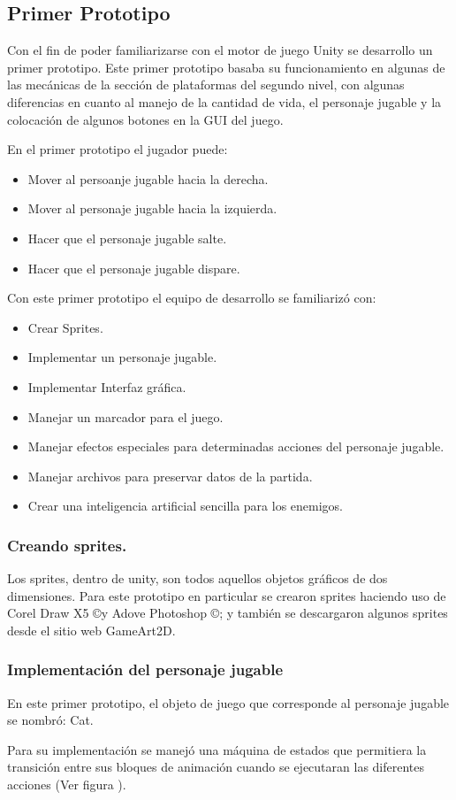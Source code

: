 \subsection{Primer Prototipo}
Con el fin de poder familiarizarse con el motor de juego Unity
se desarrollo un primer prototipo. Este primer prototipo basaba su funcionamiento 
en algunas de las mecánicas de la sección de plataformas del segundo nivel, con 
algunas diferencias en cuanto al manejo de la cantidad de vida, el personaje 
jugable y la colocación de algunos botones en la GUI del juego.
\\
\par
En el primer prototipo el jugador puede:
\begin{itemize}
	\item Mover al persoanje jugable hacia la derecha.
	\item Mover al personaje jugable hacia la izquierda.
	\item Hacer que el personaje jugable salte.
	\item Hacer que el personaje jugable dispare.
\end{itemize}

Con este primer prototipo el equipo de desarrollo se familiarizó con:
\begin{itemize}
	\item Crear Sprites.
	\item Implementar un personaje jugable.
	\item Implementar Interfaz gráfica.
	\item Manejar un marcador para el juego.
	\item Manejar efectos especiales para determinadas acciones del personaje jugable.
	\item Manejar archivos para preservar datos de la partida.
	\item Crear una inteligencia artificial sencilla para los enemigos.
\end{itemize}

\subsubsection{Creando sprites.}
Los sprites, dentro de unity, son todos aquellos objetos gráficos de dos 
dimensiones. Para este prototipo en particular se crearon sprites haciendo uso 
de Corel Draw X5  \copyright y Adove Photoshop \copyright ; y también se descargaron 
algunos sprites desde el sitio web GameArt2D.  

\subsubsection{Implementación del personaje jugable}
En este primer prototipo, el objeto de juego que corresponde al personaje 
jugable se nombró: Cat. 
\\
\par
Para su implementación se manejó una máquina de estados que permitiera la transición 
entre sus bloques de animación cuando se ejecutaran las diferentes acciones
(Ver figura ). %

